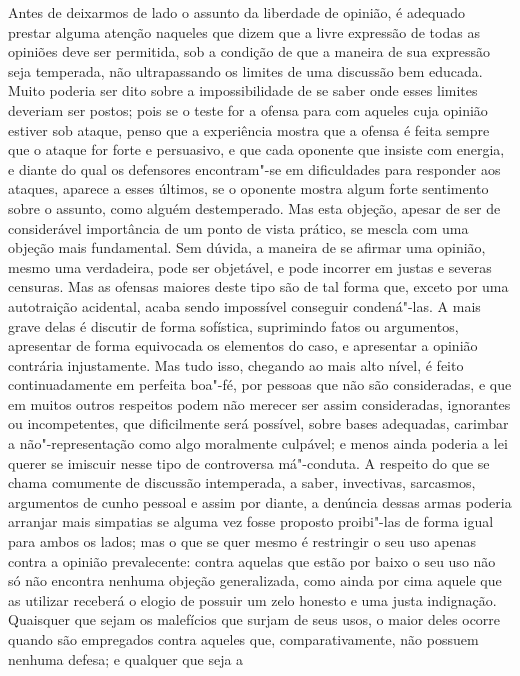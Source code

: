 Antes de deixarmos de lado o assunto da liberdade de opinião, é adequado
prestar alguma atenção naqueles que dizem que a livre expressão de
todas as opiniões deve ser permitida, sob a condição de que a maneira de
sua expressão seja temperada, não ultrapassando os limites de uma
discussão bem educada. Muito poderia ser dito sobre a impossibilidade
de se saber onde esses limites deveriam ser postos; pois se o teste for
a ofensa para com aqueles cuja opinião estiver sob ataque, penso que a
experiência mostra que a ofensa é feita sempre que o ataque for forte
e persuasivo, e que cada oponente que insiste com energia, e diante do
qual os defensores encontram"-se em dificuldades para responder aos
ataques, aparece a esses últimos, se o oponente mostra algum forte
sentimento sobre o assunto, como alguém destemperado. Mas esta
objeção, apesar de ser de considerável importância de um ponto de vista
prático, se mescla com uma objeção mais fundamental. Sem dúvida, a
maneira de se afirmar uma opinião, mesmo uma verdadeira, pode ser
objetável, e pode incorrer em justas e severas censuras. Mas as ofensas
maiores deste tipo são de tal forma que, exceto por uma autotraição
acidental, acaba sendo impossível conseguir condená"-las. A mais grave
delas é discutir de forma sofística, suprimindo fatos ou argumentos,
apresentar de forma equivocada os elementos do caso, e apresentar a
opinião contrária injustamente. Mas tudo isso, chegando ao mais alto
nível, é feito continuadamente em perfeita boa"-fé, por pessoas que não
são consideradas, e que em muitos outros respeitos podem não merecer
ser assim consideradas, ignorantes ou incompetentes, que dificilmente
será possível, sobre bases adequadas, carimbar a não"-representação como
algo moralmente culpável; e menos ainda poderia a lei querer se
imiscuir nesse tipo de controversa má"-conduta. A respeito do que se
chama comumente de discussão intemperada, a saber, invectivas,
sarcasmos, argumentos de cunho pessoal e assim por diante, a denúncia
dessas armas poderia arranjar mais simpatias se alguma vez fosse
proposto proibi"-las de forma igual para ambos os lados; mas o que se
quer mesmo é restringir o seu uso apenas contra a opinião
prevalecente: contra aquelas que estão por baixo o seu uso não só não
encontra nenhuma objeção generalizada, como ainda por cima aquele que
as utilizar receberá o elogio de possuir um zelo honesto e uma justa
indignação. Quaisquer que sejam os malefícios que surjam de seus usos,
o maior deles ocorre quando são empregados contra aqueles que,
comparativamente, não possuem nenhuma defesa; e qualquer que seja a
